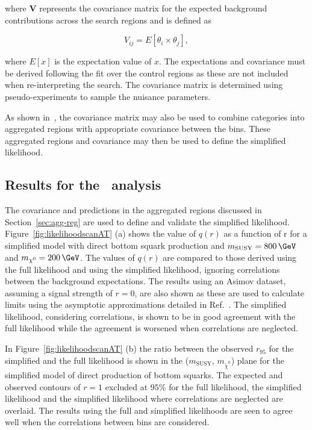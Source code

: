 where $\mathrm{\mathbf{V}}$ represents the covariance matrix for the expected background 
contributions across the search regions and is defined as

\begin{equation}
V_{ij}=E[\theta_i\times\theta_j],
\label{eq-cov}
\end{equation}

where $E[x]$ is the expectation value of $x$. The expectations and covariance
must be derived following the fit over the control regions as these are not
included when re-interpreting the search. The covariance matrix is determined
using pseudo-experiments to sample the nuisance parameters. 

As shown in~\cite{simp-lik}, the covariance matrix may also be used to
combine categories into aggregated regions with appropriate covariance between
the bins. These aggregated regions and covariance may then be used to define 
the simplified likelihood.

\subsection{Results for the \alphat~analysis}

The covariance and predictions in the aggregated regions discussed
in Section~\ref{sec:agg-reg} are used to define and validate the simplified likelihood. 
Figure~\ref{fig:likelihoodscanAT} (a) shows the value of $q(r)$ as a function of r for 
a simplified model with direct bottom squark production and $m_\text{SUSY} = 800\, \GeV$ 
and $m_{\chiz} = 200\, \GeV$. The values of $q(r)$ are compared to those derived using the full likelihood and 
using the simplified likelihood, ignoring correlations between the background expectations. 
The results using an Asimov dataset, assuming a signal strength of $r=0$, are also 
shown as these are used to calculate limits using the asymptotic approximations 
detailed in Ref.~\cite{asymp}. The simplified likelihood,
considering correlations, is shown to be in good agreement with the full likelihood while
the agreement is worsened when correlations are neglected.

In Figure~\ref{fig:likelihoodscanAT} (b) the ratio between the observed $r_{95}$ for the simplified 
and the full likelihood is shown in the ($m_{\text{SUSY}}$, $m_{\tilde{\chi}^{0}}$) plane for 
the simplified model of direct production of bottom squarks. The expected and observed contours of $r=1$ 
excluded at $95\%$ for the full likelihood, the simplified likelihood and the 
simplified likelihood where correlations are neglected are overlaid. The results using the 
full and simplified likelihoods are seen to agree well when the correlations between bins are considered.

